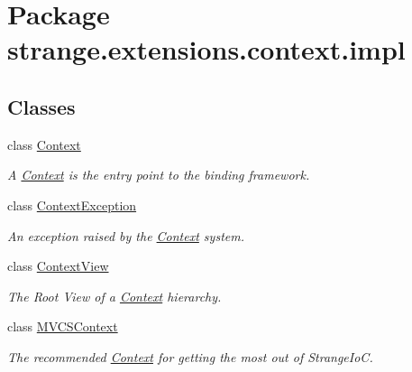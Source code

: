 \hypertarget{namespacestrange_1_1extensions_1_1context_1_1impl}{\section{Package strange.\-extensions.\-context.\-impl}
\label{namespacestrange_1_1extensions_1_1context_1_1impl}
}
\subsection*{Classes}
\begin{DoxyCompactItemize}
\item 
class \hyperlink{classstrange_1_1extensions_1_1context_1_1impl_1_1_context}{Context}
\begin{DoxyCompactList}\small\item\em A \hyperlink{classstrange_1_1extensions_1_1context_1_1impl_1_1_context}{Context} is the entry point to the binding framework. \end{DoxyCompactList}\item 
class \hyperlink{classstrange_1_1extensions_1_1context_1_1impl_1_1_context_exception}{Context\-Exception}
\begin{DoxyCompactList}\small\item\em An exception raised by the \hyperlink{classstrange_1_1extensions_1_1context_1_1impl_1_1_context}{Context} system. \end{DoxyCompactList}\item 
class \hyperlink{classstrange_1_1extensions_1_1context_1_1impl_1_1_context_view}{Context\-View}
\begin{DoxyCompactList}\small\item\em The Root View of a \hyperlink{classstrange_1_1extensions_1_1context_1_1impl_1_1_context}{Context} hierarchy. \end{DoxyCompactList}\item 
class \hyperlink{classstrange_1_1extensions_1_1context_1_1impl_1_1_m_v_c_s_context}{M\-V\-C\-S\-Context}
\begin{DoxyCompactList}\small\item\em The recommended \hyperlink{classstrange_1_1extensions_1_1context_1_1impl_1_1_context}{Context} for getting the most out of Strange\-Io\-C. \end{DoxyCompactList}\end{DoxyCompactItemize}
